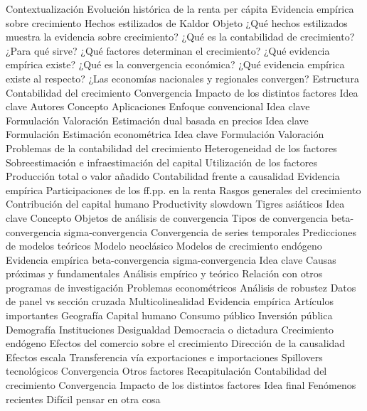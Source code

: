 \documentclass{nuevotema}
\begin{document}
\begin{esquema}[enumerate]
	\1[] 
		\2 Contextualización
			\3 Evolución histórica de la renta per cápita
			\3 Evidencia empírica sobre crecimiento
			\3 Hechos estilizados de Kaldor
		\2 Objeto
			\3 ¿Qué hechos estilizados muestra la evidencia sobre crecimiento?
			\3 ¿Qué es la contabilidad de crecimiento?
			\3 ¿Para qué sirve?
			\3 ¿Qué factores determinan el crecimiento?
			\3 ¿Qué evidencia empírica existe?
			\3 ¿Qué es la convergencia económica?
			\3 ¿Qué evidencia empírica existe al respecto?
			\3 ¿Las economías nacionales y regionales convergen?
		\2 Estructura
			\3 Contabilidad del crecimiento
			\3 Convergencia
			\3 Impacto de los distintos factores
	\1 
		\2 Idea clave
			\3 Autores
			\3 Concepto
			\3 Aplicaciones
		\2 Enfoque convencional
			\3 Idea clave
			\3 Formulación
			\3 Valoración
		\2 Estimación dual basada en precios
			\3 Idea clave
			\3 Formulación
		\2 Estimación econométrica
			\3 Idea clave
			\3 Formulación
			\3 Valoración
		\2 Problemas de la contabilidad del crecimiento
			\3 Heterogeneidad de los factores
			\3 Sobreestimación e infraestimación del capital
			\3 Utilización de los factores
			\3 Producción total o valor añadido
			\3 Contabilidad frente a causalidad
		\2 Evidencia empírica
			\3 Participaciones de los ff.pp. en la renta
			\3 Rasgos generales del crecimiento
			\3 Contribución del capital humano
			\3 Productivity slowdown
			\3 Tigres asiáticos
	\1 
		\2 Idea clave
			\3 Concepto
			\3 Objetos de análisis de convergencia
		\2 Tipos de convergencia
			\3 beta-convergencia
			\3 sigma-convergencia
			\3 Convergencia de series temporales
		\2 Predicciones de modelos teóricos
			\3 Modelo neoclásico
			\3 Modelos de crecimiento endógeno
		\2 Evidencia empírica
			\3 beta-convergencia
			\3 sigma-convergencia
	\1 
		\2 Idea clave
			\3 Causas próximas y fundamentales
			\3 Análisis empírico y teórico
			\3 Relación con otros programas de investigación
		\2 Problemas econométricos
			\3 Análisis de robustez
			\3 Datos de panel vs sección cruzada
			\3 Multicolinealidad
		\2 Evidencia empírica
			\3 Artículos importantes
			\3 Geografía
			\3 Capital humano
			\3 Consumo público
			\3 Inversión pública
			\3 Demografía
			\3 Instituciones
			\3 Desigualdad
			\3 Democracia o dictadura
			\3 Crecimiento endógeno
		\2 Efectos del comercio sobre el crecimiento
			\3 Dirección de la causalidad
			\3 Efectos escala
			\3 Transferencia vía exportaciones e importaciones
			\3 Spillovers tecnológicos
			\3 Convergencia
			\3 Otros factores
	\1[] 
		\2 Recapitulación
			\3 Contabilidad del crecimiento
			\3 Convergencia
			\3 Impacto de los distintos factores
		\2 Idea final
			\3 Fenómenos recientes
			\3 Difícil pensar en otra cosa

\end{esquema}
\end{document}
